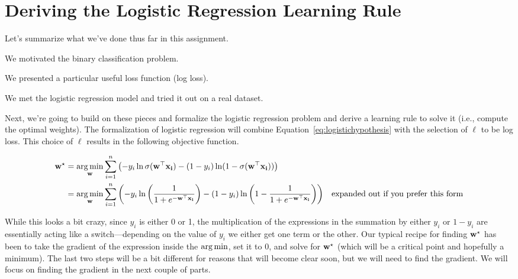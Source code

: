 \documentclass[assignment04_Solutions]{subfiles}
\begin{document}

\section{Deriving the Logistic Regression Learning Rule}
Let's summarize what we've done thus far in this assignment.

\bi
\item We motivated the binary classification problem.
\item We presented a particular useful loss function (log loss).
\item We met the logistic regression model and tried it out on a real dataset.
\ei

Next, we're going to build on these pieces and formalize the logistic regression problem and derive a learning rule to solve it (i.e., compute the optimal weights). The formalization of logistic regression will combine Equation~\ref{eq:logistichypothesis} with the selection of $\ell$ to be log loss.  This choice of $\ell$ results in the following objective function.

\begin{align}
\mathbf{w}^\star &= \operatorname*{arg\,min}_{\mathbf{w}} \sum_{i=1}^n \left ( - y_i \ln \sigma(\mathbf{w}^\top \mathbf{x_i}) - (1-y_i) \ln (1 - \sigma(\mathbf{w}^\top \mathbf{x_i}) ) \right) \\
&= \operatorname*{arg\,min}_{\mathbf{w}} \sum_{i=1}^n \left (  - y_i \ln \left ( \frac{1}{1+e^{-\mathbf{w}^\top \mathbf{x_i}}} \right) - (1-y_i) \ln  \left (1 - \frac{1}{1+e^{-\mathbf{w}^\top \mathbf{x_i}}} \right ) \right) &\mbox{expanded out if you prefer this form} \label{eq:objective}
\end{align}

While this looks a bit crazy, since $y_i$ is either 0 or 1, the multiplication of the expressions in the summation by either $y_i$ or $1-y_i$ are essentially acting like a switch---depending on the value of $y_i$ we either get one term or the other.  Our typical recipe for finding $\mathbf{w}^\star$ has been to take the gradient of the expression inside the $\operatorname*{arg\,min}$, set it to $0$, and solve for $\mathbf{w}^\star$ (which will be a critical point and hopefully a minimum).  The last two steps will be a bit different for reasons that will become clear soon, but we will need to find the gradient.  We will focus on finding the gradient in the next couple of parts.
\end{document}
